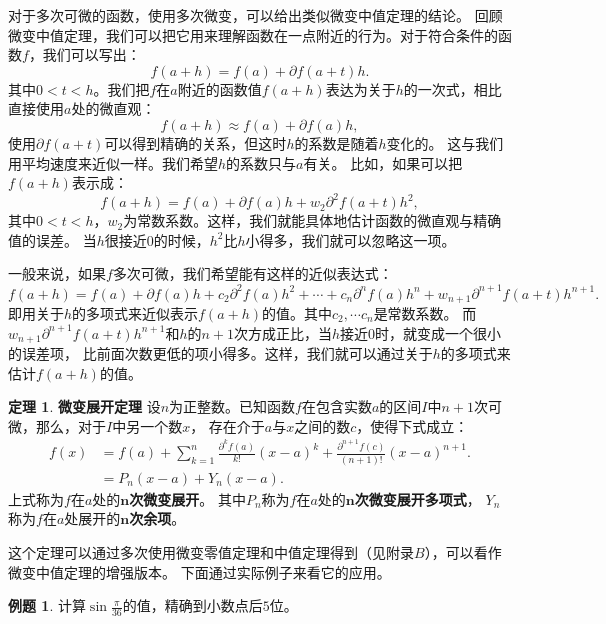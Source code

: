 \documentclass[12pt,UTF8]{ctexbook}
\theoremstyle{definition}
\newtheorem{tm}{定理}[section]
\newtheorem{et}{例题}[section]
\theoremstyle{plain}
\begin{document}
对于多次可微的函数，使用多次微变，可以给出类似微变中值定理的结论。
回顾微变中值定理，我们可以把它用来理解函数在一点附近的行为。对于符合条件的函数$f$，我们可以写出：
$$ f(a + h) = f(a) + \partial f(a + t) h.$$
其中$0<t<h$。我们把$f$在$a$附近的函数值$f(a+h)$表达为关于$h$的一次式，相比直接使用$a$处的微直观：
$$ f(a + h) \approx f(a) + \partial f(a) h,$$
使用$\partial f(a + t)$可以得到精确的关系，但这时$h$的系数是随着$h$变化的。
这与我们用平均速度来近似一样。我们希望$h$的系数只与$a$有关。
比如，如果可以把$f(a + h)$表示成：
$$ f(a + h) = f(a) + \partial f(a) h + w_2\partial^2 f(a + t) h^2,$$
其中$0<t<h$，$w_2$为常数系数。这样，我们就能具体地估计函数的微直观与精确值的误差。
当$h$很接近$0$的时候，$h^2$比$h$小得多，我们就可以忽略这一项。

一般来说，如果$f$多次可微，我们希望能有这样的近似表达式：
$$ f(a + h) = f(a) + \partial f(a) h + c_2 \partial^2 f(a) h^2 + \cdots + c_n \partial^n f(a) h^n + w_{n+1}\partial^{n+1} f(a + t) h^{n+1}.$$
即用关于$h$的多项式来近似表示$f(a + h)$的值。其中$c_2, \cdots c_n$是常数系数。
而$w_{n+1}\partial^{n+1} f(a + t) h^{n+1}$和$h$的$n+1$次方成正比，当$h$接近$0$时，就变成一个很小的误差项，
比前面次数更低的项小得多。这样，我们就可以通过关于$h$的多项式来估计$f(a + h)$的值。

\begin{tm}{\textbf{微变展开定理}}
    设$n$为正整数。已知函数$f$在包含实数$a$的区间$I$中$n+1$次可微，那么，对于$I$中另一个数$x$，
    存在介于$a$与$x$之间的数$c$，使得下式成立：
    \begin{align*}
        f(x) &= f(a) + \sum_{k=1}^n \frac{\partial^k f (a)}{k!}(x - a)^k + \frac{\partial^{n+1} f (c)}{(n+1)!}(x - a)^{n+1}.  \\
        &= P_n(x - a) + Y_n(x - a). 
    \end{align*}
    上式称为$f$在$a$处的$\boldsymbol{n}$\textbf{次微变展开}。
    其中$P_n$称为$f$在$a$处的$\boldsymbol{n}$\textbf{次微变展开多项式}，
    $Y_n$称为$f$在$a$处展开的$\boldsymbol{n}$\textbf{次余项}。
    
\end{tm}

这个定理可以通过多次使用微变零值定理和中值定理得到（见附录$B$），可以看作微变中值定理的增强版本。
下面通过实际例子来看它的应用。

\begin{et}
    计算$\sin{\frac{\pi}{36}}$的值，精确到小数点后$5$位。
\end{et}
\end{document}
